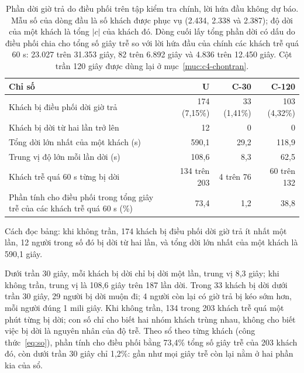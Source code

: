 \begin{table}[htbp]
\centering
\caption{Phần dời giờ trả do điều phối trên tập kiểm tra chính, lời hứa đầu không dự báo. Mẫu số của
dòng đầu là số khách được phục vụ (2.434, 2.338 và 2.387); độ dời của một khách là tổng $|c|$ của khách
đó. Dòng cuối lấy tổng phần dời có dấu do điều phối chia cho tổng số giây trễ so với lời hứa đầu của chính các khách
trễ quá 60 s: 23.027 trên 31.353 giây, 82 trên 6.892 giây và 4.836 trên 12.450 giây. Cột trần 120 giây được dùng
lại ở mục~\ref{muc:c4-chontran}.}
\label{bang:c4-doidieuphoi}
\small
\begin{tabular}{@{}p{7.6cm}rrr@{}}
\toprule
\textbf{Chỉ số} & \textbf{U} & \textbf{C-30} & \textbf{C-120}\\
\midrule
Khách bị điều phối dời giờ trả & 174 (7,15\%) & 33 (1,41\%) & 103 (4,32\%)\\
Khách bị dời từ hai lần trở lên & 12 & 0 & 0\\
Tổng dời lớn nhất của một khách (s) & 590,1 & 29,2 & 118,9\\
Trung vị độ lớn mỗi lần dời (s) & 108,6 & 8,3 & 62,5\\
Khách trễ quá 60 s từng bị dời & 134 trên 203 & 4 trên 76 & 60 trên 132\\
Phần tính cho điều phối trong tổng giây trễ của các khách trễ quá 60 s (\%) & 73,4 & 1,2 & 38,8\\
\bottomrule
\end{tabular}
\end{table}

Cách đọc bảng: khi không trần, 174 khách bị điều phối dời giờ trả ít nhất một lần, 12 người trong số đó bị dời từ
hai lần, và tổng dời lớn nhất của một khách là 590,1 giây.

Dưới trần 30 giây, mỗi khách bị dời chỉ bị dời một lần, trung vị 8,3 giây; khi không trần, trung vị là 108,6 giây
trên 187 lần dời. Trong 33 khách bị dời dưới trần 30 giây, 29 người bị dời muộn đi; 4 người còn lại có giờ trả bị kéo
sớm hơn, mỗi người đúng 1 mili giây. Khi không trần, 134 trong 203 khách trễ quá một phút từng bị dời; con số chỉ cho
biết hai nhóm khách trùng nhau, không cho biết việc bị dời là nguyên nhân của độ trễ. Theo sổ theo từng khách (công
thức~\eqref{eq:so}), phần tính cho điều phối bằng 73,4\% tổng số giây trễ của 203 khách đó, còn dưới trần 30 giây
chỉ 1,2\%: gần như mọi giây trễ còn lại nằm ở hai phần kia của sổ.

